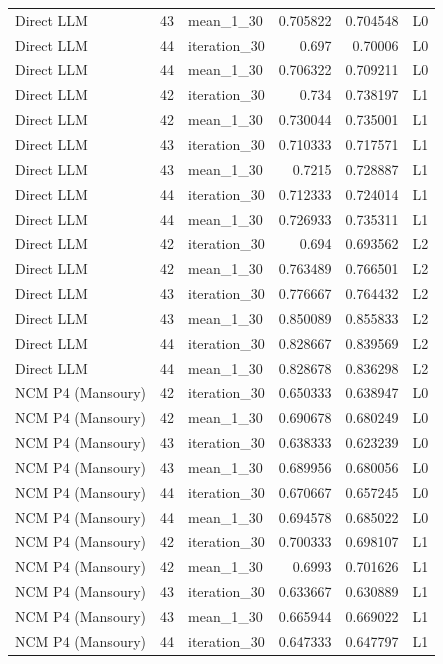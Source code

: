 \begin{table}[htbp!]
\begin{tabular}{lrlrrl}
Direct LLM & 43 & mean\_1\_30 & 0.705822 & 0.704548 & L0 \\
Direct LLM & 44 & iteration\_30 & 0.697 & 0.70006 & L0 \\
Direct LLM & 44 & mean\_1\_30 & 0.706322 & 0.709211 & L0 \\
Direct LLM & 42 & iteration\_30 & 0.734 & 0.738197 & L1 \\
Direct LLM & 42 & mean\_1\_30 & 0.730044 & 0.735001 & L1 \\
Direct LLM & 43 & iteration\_30 & 0.710333 & 0.717571 & L1 \\
Direct LLM & 43 & mean\_1\_30 & 0.7215 & 0.728887 & L1 \\
Direct LLM & 44 & iteration\_30 & 0.712333 & 0.724014 & L1 \\
Direct LLM & 44 & mean\_1\_30 & 0.726933 & 0.735311 & L1 \\
Direct LLM & 42 & iteration\_30 & 0.694 & 0.693562 & L2 \\
Direct LLM & 42 & mean\_1\_30 & 0.763489 & 0.766501 & L2 \\
Direct LLM & 43 & iteration\_30 & 0.776667 & 0.764432 & L2 \\
Direct LLM & 43 & mean\_1\_30 & 0.850089 & 0.855833 & L2 \\
Direct LLM & 44 & iteration\_30 & 0.828667 & 0.839569 & L2 \\
Direct LLM & 44 & mean\_1\_30 & 0.828678 & 0.836298 & L2 \\
NCM P4 (Mansoury) & 42 & iteration\_30 & 0.650333 & 0.638947 & L0 \\
NCM P4 (Mansoury) & 42 & mean\_1\_30 & 0.690678 & 0.680249 & L0 \\
NCM P4 (Mansoury) & 43 & iteration\_30 & 0.638333 & 0.623239 & L0 \\
NCM P4 (Mansoury) & 43 & mean\_1\_30 & 0.689956 & 0.680056 & L0 \\
NCM P4 (Mansoury) & 44 & iteration\_30 & 0.670667 & 0.657245 & L0 \\
NCM P4 (Mansoury) & 44 & mean\_1\_30 & 0.694578 & 0.685022 & L0 \\
NCM P4 (Mansoury) & 42 & iteration\_30 & 0.700333 & 0.698107 & L1 \\
NCM P4 (Mansoury) & 42 & mean\_1\_30 & 0.6993 & 0.701626 & L1 \\
NCM P4 (Mansoury) & 43 & iteration\_30 & 0.633667 & 0.630889 & L1 \\
NCM P4 (Mansoury) & 43 & mean\_1\_30 & 0.665944 & 0.669022 & L1 \\
NCM P4 (Mansoury) & 44 & iteration\_30 & 0.647333 & 0.647797 & L1 \\

\end{tabular}
\end{table}
